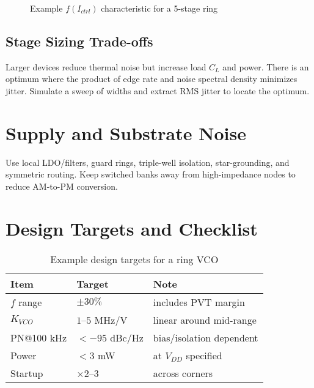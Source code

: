 \begin{figure}[H]
  \centering
  \caption{Example $f(I_{ctrl})$ characteristic for a 5-stage ring}
\end{figure}

\subsection*{Stage Sizing Trade-offs}
Larger devices reduce thermal noise but increase load \(C_L\) and power. There is an optimum where the product of edge rate and noise spectral density minimizes jitter. Simulate a sweep of widths and extract RMS jitter to locate the optimum.

\section{Supply and Substrate Noise}
Use local LDO/filters, guard rings, triple-well isolation, star-grounding, and symmetric routing. Keep switched banks away from high-impedance nodes to reduce AM-to-PM conversion.

\section{Design Targets and Checklist}
\begin{table}[H]
  \centering
  \begin{tabular}{lll}
    \toprule
    Item & Target & Note \\
    \midrule
    $f$ range & $\pm 30\%$ & includes PVT margin \\
    $K_{VCO}$ & $1$--$5$ MHz/V & linear around mid-range \\
    PN@100 kHz & $< -95$ dBc/Hz & bias/isolation dependent \\
    Power & $< 3$ mW & at $V_{DD}$ specified \\
    Startup & $\times 2$--$3$ & across corners \\
    \bottomrule
  \end{tabular}
  \caption{Example design targets for a ring VCO}
\end{table}

